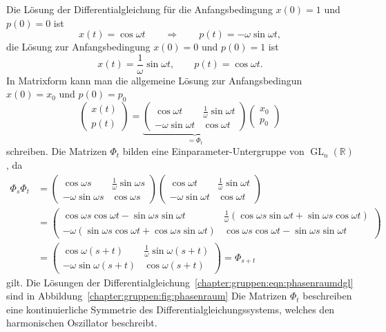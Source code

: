 Die Lösung der Differentialgleichung für die Anfangsbedingung $x(0)=1$ und
$p(0)=0$ ist
\[
x(t)
=
\cos \omega t
\qquad\Rightarrow\qquad
p(t)
=
-\omega \sin\omega t,
\]
die Lösung zur Anfangsbedingung $x(0)=0$ und $p(0)=1$ ist
\[
x(t) = \frac{1}{\omega} \sin\omega t,
\qquad
p(t) = \cos \omega t.
\]
In Matrixform kann man die allgemeine Lösung zur Anfangsbedingun $x(0)=x_0$
und $p(0)=p_0$
\begin{equation}
\begin{pmatrix}
x(t)\\
p(t)
\end{pmatrix}
=
\underbrace{
\begin{pmatrix}
 \cos \omega t & \frac{1}{\omega} \sin\omega t \\
-\omega \sin\omega t & \cos\omega t
\end{pmatrix}
}_{\displaystyle =\Phi_t}
\begin{pmatrix}x_0\\p_0\end{pmatrix}
\label{buch:gruppen:eqn:phi}
\end{equation}
schreiben.
Die Matrizen $\Phi_t$ bilden eine Einparameter-Untergruppe von
$\operatorname{GL}_n(\mathbb{R})$, da
\begin{align*}
\Phi_s\Phi_t
&=
\begin{pmatrix}
 \cos\omega s & \frac{1}{\omega} \sin\omega s \\
-\omega \sin\omega s & \cos\omega s
\end{pmatrix}
\begin{pmatrix}
 \cos\omega t & \frac{1}{\omega} \sin\omega t \\
-\omega \sin\omega t & \cos\omega t
\end{pmatrix}
\\
&=
\begin{pmatrix}
\cos\omega s \cos\omega t - \sin\omega s \sin\omega t 
& \frac{1}{\omega} ( \cos\omega s \sin\omega t + \sin\omega s \cos \omega t)
\\
-\omega (\sin\omega s \cos\omega t + \cos\omega s \sin\omega t )
& \cos\omega s \cos\omega t -\sin\omega s \sin\omega t 
\end{pmatrix}
\\
&=
\begin{pmatrix}
 \cos\omega(s+t) & \frac{1}{\omega}\sin\omega(s+t) \\
-\omega \sin\omega(s+t) & \cos\omega(s+t)
\end{pmatrix}
=
\Phi_{s+t}
\end{align*}
gilt.
Die Lösungen der 
Differentialgleichung~\eqref{chapter:gruppen:eqn:phasenraumdgl}
sind in Abbildung~\ref{chapter:gruppen:fig:phasenraum}
Die Matrizen $\Phi_t$ beschreiben eine kontinuierliche Symmetrie
des Differentialgleichungssystems, welches den harmonischen Oszillator
beschreibt.

